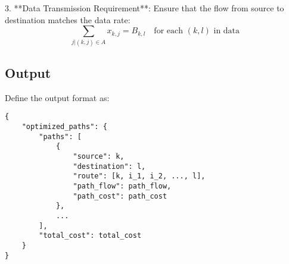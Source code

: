 \documentclass{article}
\begin{document}
3. **Data Transmission Requirement**:
   Ensure that the flow from source to destination matches the data rate:
   \[
   \sum_{j | (k,j) \in A} x_{k,j} = B_{k,l} \quad \text{for each } (k,l) \text{ in data}
   \]

\subsection*{Output}
Define the output format as:
\begin{verbatim}
{
    "optimized_paths": {
        "paths": [
            {
                "source": k,
                "destination": l,
                "route": [k, i_1, i_2, ..., l],
                "path_flow": path_flow,
                "path_cost": path_cost
            },
            ...
        ],
        "total_cost": total_cost
    }
}
\end{verbatim}
\end{document}
